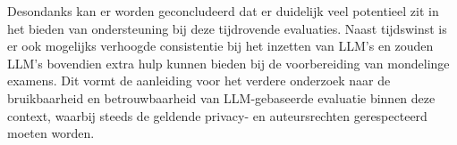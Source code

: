 \vspace{1em}

Desondanks kan er worden geconcludeerd dat er duidelijk veel potentieel zit in het bieden van ondersteuning bij deze tijdrovende evaluaties. Naast tijdswinst is er ook mogelijks verhoogde consistentie bij het inzetten van LLM's en zouden LLM's bovendien extra hulp kunnen bieden bij de voorbereiding van mondelinge examens. Dit vormt de aanleiding voor het verdere onderzoek naar de bruikbaarheid en betrouwbaarheid van LLM-gebaseerde evaluatie binnen deze context, waarbij steeds de geldende privacy- en auteursrechten gerespecteerd moeten worden.
